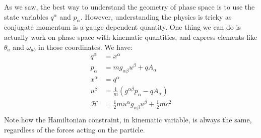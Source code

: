 As we saw, the best way to understand the geometry of phase space is to use the state variables $q^\alpha$ and $p_\alpha$. However, understanding the physics is tricky as conjugate momentum is a gauge dependent quantity. One thing we can do is actually work on phase space with kinematic quantities, and express elements like $\theta_a$ and $\omega_{ab}$ in those coordinates. We have:
\begin{equation}
	\begin{aligned}
		q^\alpha &= x^\alpha \\
		p_\alpha &= m g_{\alpha \beta} u^\beta + q A_\alpha \\
		x^\alpha &= q^\alpha \\
		u^\beta  &= \frac{1}{m} \left( g^{\alpha \beta} p_\alpha - q A_\alpha \right) \\
		\mathcal{H} &= \frac{1}{2} m u^\alpha g_{\alpha\beta} u^\beta + \frac{1}{2}mc^2  \\
	\end{aligned}
\end{equation}
Note how the Hamiltonian constraint, in kinematic variable, is always the same, regardless of the forces acting on the particle.

